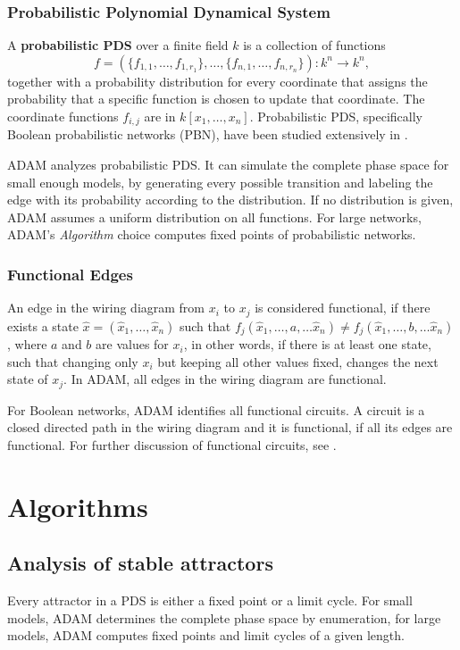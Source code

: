 \documentclass[11pt]{amsart}
\begin{document}
\subsubsection{Probabilistic Polynomial Dynamical System}
A {\bf probabilistic PDS} over a finite field $k$ is a collection of functions
$$f = (\{f_{1,1}, \ldots, f_{1, r_1}\}, \ldots, \{f_{n, 1}, \ldots, f_{n, r_n}
\}) : k^n \rightarrow k^n,$$ 
together with a probability distribution for every coordinate that assigns the
probability that a specific function is chosen to update that coordinate. 
The coordinate functions $f_{i,j}$ are in $k[x_1, \ldots , x_n]$. 
Probabilistic PDS, specifically Boolean probabilistic networks (PBN), have been studied
extensively in \cite{shmulevich}. 

ADAM analyzes probabilistic PDS. It can simulate the
complete phase space for small enough models, by generating every possible
transition and labeling the edge with its probability according to the
distribution. If no distribution is given, ADAM assumes a uniform distribution
on all functions. For large networks, ADAM's {\it Algorithm} choice computes
fixed points of probabilistic networks.


\subsubsection{Functional Edges}
An edge in the wiring diagram from $x_i$ to $x_j$ is considered
functional, if there exists a state $\hat x = (\hat x_1,  \ldots, \hat x_n)$ such
that $f_j( \hat x_1,  \ldots, a, \ldots \hat x_n) \neq f_j(\hat x_1, \ldots, b, \ldots
\hat x_n)$, where $a$ and $b$ are values for $x_i$, in other words, if there
is at least one state, such that changing only $x_i$ but keeping all other
values fixed, changes the next state of $x_j$. 
In ADAM, all edges in the wiring diagram are functional. 

For Boolean networks, ADAM identifies all functional circuits. A circuit is a
closed directed path in the wiring diagram and it is functional, if all its
edges are functional. For further discussion of
functional circuits, see \cite{Chaouiya}. 

\section{Algorithms}
\subsection{Analysis of stable attractors}
Every attractor in a PDS is either a
fixed point or a limit cycle. For small models, ADAM determines the complete
phase space by enumeration, for large models, ADAM computes fixed points and
limit cycles of a given length. 
\end{document}
